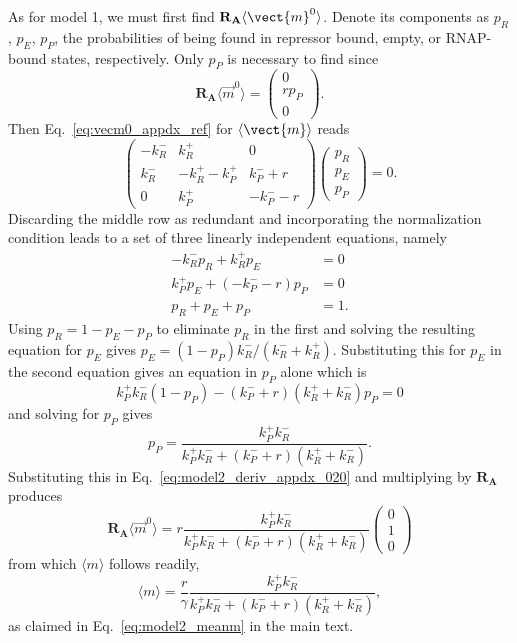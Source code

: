 As for model 1, we must first find $\mathbf{R_A} \langle\vect{m}^0\rangle$.
Denote its components as $p_R$, $p_E$, $p_P$, the probabilities of being found
in repressor bound, empty, or RNAP-bound states, respectively. Only $p_P$ is
necessary to find since
\begin{equation}
\mathbf{R_A} \langle\vec{m}^0\rangle
= \begin{pmatrix} 0 \\ r p_P \\ 0 \end{pmatrix}.
\label{eq:model2_deriv_appdx_020}
\end{equation}
Then Eq.~\ref{eq:vecm0_appdx_ref} for $\langle\vect{m}\rangle$ reads
\begin{equation}
\begin{pmatrix} -k_R^- & k_R^+ & 0 \\
        k_R^- & -k_R^+ -k_P^+ & k_P^- + r\\
        0 & k_P^+ & -k_P^- - r
\end{pmatrix}
\begin{pmatrix}
    p_R \\ p_E \\ p_P
\end{pmatrix}
= 0.
\label{eq:model2_K-R+R_for_m0}
\end{equation}
Discarding the middle row as redundant and incorporating the normalization
condition leads to a set of three linearly independent equations, namely
\begin{align}
-k_R^- p_R + k_R^+ p_E &= 0 \\
k_P^+ p_E + (-k_P^- - r) p_P &= 0 \\
p_R + p_E + p_P &= 1.
\end{align}
Using $p_R = 1 - p_E - p_P$ to eliminate $p_R$ in the first and solving the
resulting equation for $p_E$ gives
$p_E = (1 - p_P){k_R^-}/{(k_R^- + k_R^+)}$.
Substituting this for $p_E$ in the second equation gives an equation in
$p_P$ alone which is
\begin{equation}
k_P^+ k_R^- (1-p_P) - (k_P^- + r)(k_R^+ + k_R^-) p_P = 0
\end{equation}
and solving for $p_P$ gives
\begin{equation}
p_P = \frac{k_P^+ k_R^-}{k_P^+ k_R^- + (k_P^- + r)(k_R^+ + k_R^-)}.
\end{equation}
Substituting this in Eq.~\ref{eq:model2_deriv_appdx_020} and multiplying by
$\mathbf{R_A}$ produces
\begin{equation}
\mathbf{R_A} \langle\vec{m}^0\rangle
= r \frac{k_P^+ k_R^-} {k_P^+ k_R^- + (k_P^- + r)(k_R^+ + k_R^-)}
\begin{pmatrix} 0 \\ 1 \\ 0 \end{pmatrix}
\end{equation}
from which $\langle{m}\rangle$ follows readily,
\begin{equation}
\langle{m}\rangle = \frac{r}{\gamma}
        \frac{k_P^+ k_R^-} {k_P^+ k_R^- + (k_P^- + r)(k_R^+ + k_R^-)},
\label{eq:model2_meanm_appdx}
\end{equation}
as claimed in Eq.~\ref{eq:model2_meanm} in the main text.

